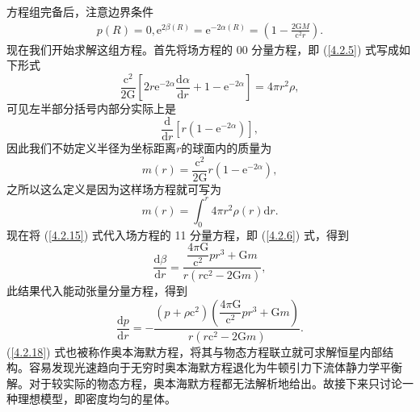 \documentclass[11pt, a4paper, oneside, onecolumn]{ctexart}
\numberwithin{equation}{subsection}
\begin{document}
方程组完备后，注意边界条件
\begin{align}
p\left(R\right)=0,\mathrm{e}^{2\beta\left(R\right)}=\mathrm{e}^{-2\alpha\left(R\right)}=\left(1-\frac{2\mathrm{G}M}{\mathrm{c}^{2}r}\right).
\end{align}
现在我们开始求解这组方程。首先将场方程的 00 分量方程，即 (\ref{4.2.5}) 式写成如下形式
\begin{equation}
\frac{\mathrm{c}^{2}}{2\mathrm{G}}\left[2r\mathrm{e}^{-2\alpha}\frac{\mathrm{d}\alpha}{\mathrm{d}r}+1-\mathrm{e}^{-2\alpha}\right]=4\pi r^{2}\rho,
\end{equation}
可见左半部分括号内部分实际上是
\begin{equation}
\frac{\mathrm{d}}{\mathrm{d}r}\left[r\left(1-\mathrm{e}^{-2\alpha}\right)\right],
\end{equation}
因此我们不妨定义半径为坐标距离$r$的球面内的质量为
\begin{equation}
m\left(r\right)=\frac{\mathrm{c}^{2}}{2\mathrm{G}}r\left(1-\mathrm{e}^{-2\alpha}\right),\label{4.2.15}
\end{equation}
之所以这么定义是因为这样场方程就可写为
\begin{equation}
m\left(r\right)=\int_{0}^{r}4\pi r^{2}\rho\left(r\right)\mathrm{d}r.
\end{equation}
现在将 (\ref{4.2.15}) 式代入场方程的 11 分量方程，即 (\ref{4.2.6}) 式，得到
\begin{equation}
\frac{\mathrm{d}\beta}{\mathrm{d}r}=\frac{\dfrac{4\pi\mathrm{G}}{\mathrm{c}^{2}}pr^{3}+\mathrm{G}m}{r\left(r\mathrm{c}^{2}-2\mathrm{G}m\right)},\label{4.2.17}
\end{equation}
此结果代入能动张量分量方程，得到
\begin{equation}
\frac{\mathrm{d}p}{\mathrm{d}r}=-\frac{\left(p+\rho \mathrm{c}^{2}\right)\left(\dfrac{4\pi\mathrm{G}}{\mathrm{c}^{2}}pr^{3}+\mathrm{G}m\right)}{r\left(r\mathrm{c}^{2}-2\mathrm{G}m\right)}.\label{4.2.18}
\end{equation}
(\ref{4.2.18}) 式也被称作奥本海默方程，将其与物态方程联立就可求解恒星内部结构。容易发现光速趋向于无穷时奥本海默方程退化为牛顿引力下流体静力学平衡解。对于较实际的物态方程，奥本海默方程都无法解析地给出。故接下来只讨论一种理想模型，即密度均匀的星体。
\end{document}
